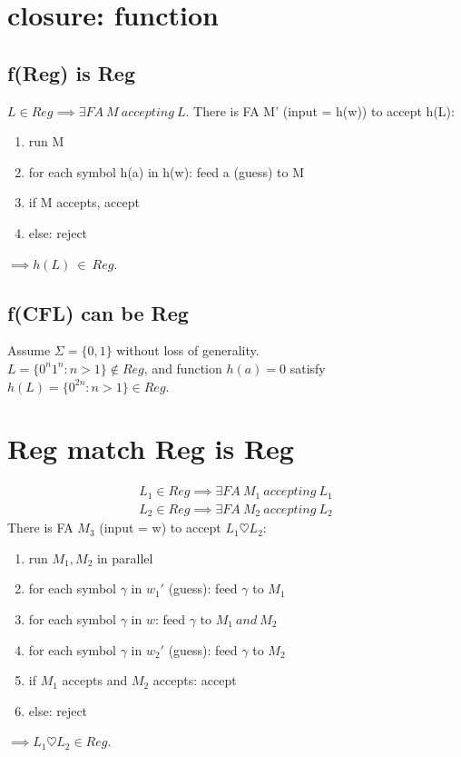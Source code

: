\documentclass{article}
\begin{document}
\section{closure: function}

\subsection{f(Reg) is Reg}
$ L \in Reg \implies \exists FA \ M \ accepting \ L $.
There is FA M' (input = h(w)) to accept h(L):
\begin{enumerate}
	\item run M
	\item for each symbol h(a) in h(w): feed a (guess) to M
	\item if M accepts, accept
	\item else: reject
\end{enumerate}
$ \implies h(L) \ \in \ Reg $.

\subsection{f(CFL) can be Reg}
Assume $ \Sigma = \{0, 1\} $ without loss of generality.\\
$ L = \{0^n1^n: n>1\} \notin Reg $, and function $ h(a) = 0 $
satisfy $ h(L) = \{0^{2n}: n>1\} \in Reg $.

\section{Reg match Reg is Reg}

\begin{align*}
L_1 \in Reg \implies \exists FA \ M_1 \ accepting \ L_1\\
L_2 \in Reg \implies \exists FA \ M_2 \ accepting \ L_2
\end{align*}
There is FA $ M_3 $ (input = w) to accept $ L_1 \heartsuit L_2 $:
\begin{enumerate}
	\item run $ M_1, M_2 $ in parallel
	\item for each symbol $ \gamma $ in $ w_1' $ (guess): feed $ \gamma $ to $ 
	M_1 $
	\item for each symbol $ \gamma $ in $ w $: feed $ \gamma $ to $ M_1 \ and \ 
	M_2 $
	\item for each symbol $ \gamma $ in $ w_2' $ (guess): feed $ \gamma $ to $ 
	M_2 $
	\item if $ M_1 $ accepts and $ M_2 $ accepts: accept
	\item else: reject
\end{enumerate}
$ \implies L_1 \heartsuit L_2 \in Reg$.
\end{document}
